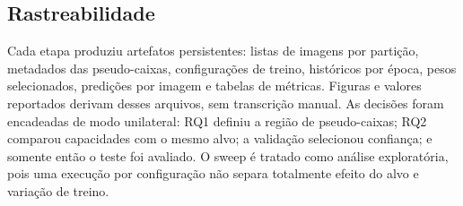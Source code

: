 \subsection{Rastreabilidade}

Cada etapa produziu artefatos persistentes: listas de imagens por parti\c{c}\~ao,
metadados das pseudo-caixas, configura\c{c}\~oes de treino, hist\'oricos por
\'epoca, pesos selecionados, predi\c{c}\~oes por imagem e tabelas de m\'etricas.
Figuras e valores reportados derivam desses arquivos, sem transcri\c{c}\~ao
manual. As decis\~oes foram encadeadas de modo unilateral: RQ1 definiu a regi\~ao
de pseudo-caixas; RQ2 comparou capacidades com o mesmo alvo; a valida\c{c}\~ao
selecionou confian\c{c}a; e somente ent\~ao o teste foi avaliado. O sweep \'e
tratado como an\'alise explorat\'oria, pois uma execu\c{c}\~ao por configura\c{c}\~ao
n\~ao separa totalmente efeito do alvo e varia\c{c}\~ao de treino.
